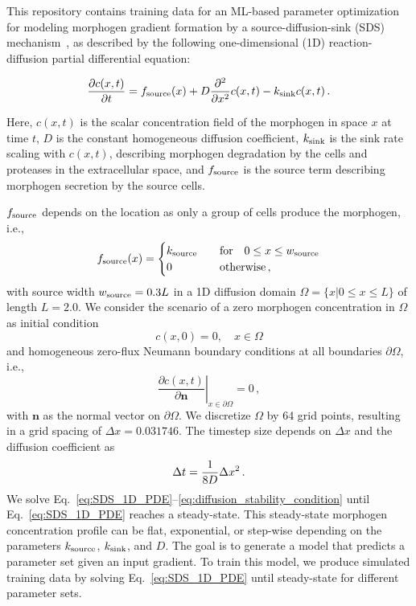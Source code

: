 \documentclass[11pt]{article}
\begin{document}
This repository contains training data for an ML-based parameter optimization for modeling morphogen gradient formation by a source-diffusion-sink (SDS) mechanism~\cite{Yu2009}, as described by the following one-dimensional (1D) reaction-diffusion partial differential equation:

\begin{equation}\label{eq:SDS_1D_PDE}
	\frac{\partial c(x,t)}{\partial t} = f_{\rm{source}}(x) + D\frac{\partial^2 }{\partial x^2}c(x,t) - k_{\rm{sink}}c(x,t)\,.
\end{equation}

Here, $c(x,t)$ is the scalar concentration field of the morphogen in space $x$ at time $t$, $D$ is the constant homogeneous diffusion coefficient, $k_{\rm{sink}}$ is the sink rate scaling with $c(x,t)$, describing morphogen degradation by the cells and proteases in the extracellular space, and $f_{\rm{source}}$ is the source term describing morphogen secretion by the source cells. 

$f_{\rm{source}}$ depends on the location as only a group of cells produce the morphogen, i.e.,
\begin{equation}\label{eq:source}
	f_{\rm{source}}(x) =
        \begin{cases}
        k_{\rm{source}} \quad & \text{for} \quad  0 \le x \le w_{\rm{source}}  \\
        0 & \rm{otherwise}\, ,
    \end{cases}  
\end{equation}
%
with source width $w_{\rm{source}} = 0.3 L$ in a 1D diffusion domain $\Omega = \{x | 0 \leq x \leq L\} $ of length $L=2.0$. We consider the scenario of a zero morphogen concentration in $\Omega$ as initial condition
%
\begin{equation}\label{eq:IC}
	c(x,0) = 0, \quad x \in \Omega
\end{equation}
%
and homogeneous zero-flux Neumann boundary conditions at all boundaries $\partial \Omega$, i.e.,
%
\begin{equation}\label{eq:no_flux_BCs}
    \left. \frac{\partial c(x, t)}{\partial \bm n} \right\rvert_{x \in \partial \Omega} = 0\,,
\end{equation}
with $\bm n$ as the normal vector on $\partial \Omega$. We discretize $\Omega$ by 64 grid points, resulting in a grid spacing of $\Delta x=0.031746$. The timestep size depends on $\Delta x$ and the diffusion coefficient as
%
\begin{equation}{\label{eq:diffusion_stability_condition}}
    \Delta t = \frac{1}{8  D}  \Delta x^{2}\, .
\end{equation}
%
We solve Eq.~\eqref{eq:SDS_1D_PDE}--\eqref{eq:diffusion_stability_condition} until Eq.~\eqref{eq:SDS_1D_PDE} reaches a steady-state. This steady-state morphogen concentration profile can be flat, exponential, or step-wise depending on the parameters $k_{\rm{source}}$, $k_{\rm{sink}}$, and $D$. The goal is to generate a model that predicts a parameter set given an input gradient. To train this model, we produce simulated training data by solving Eq.~\eqref{eq:SDS_1D_PDE} until steady-state for different parameter sets.
\end{document}

